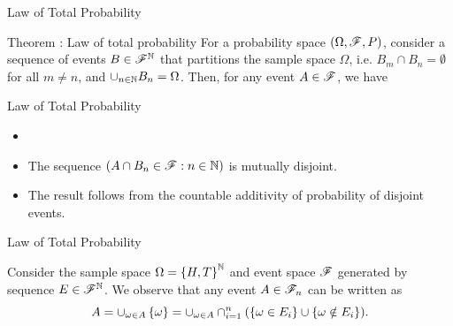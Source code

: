\documentclass[12pt,aspectratio=169]{beamer}
\begin{document}
\begin{frame}{Law of Total Probability}
\begin{block}{Theorem : Law of total probability} 
For a probability space $(\Omega, \mathscr{F}, P)$, 
consider a sequence of events $B\in \mathscr{F}^{\mathbb{N}}$ that partitions the sample space $\Omega$, i.e. 
$B_m \cap B_n = \emptyset$ for all $m \neq n$, and $\cup_{n \in \mathbb{N}}B_n = \Omega$. 
Then, for any event $A \in \mathscr{F}$, we have 
\end{block}
\end{frame}
\begin{frame}{Law of Total Probability}
\begin{Proof}
\begin{itemize}
    \item <1-> 
    \item <2-> The sequence $(A \cap B_n \in \mathscr{F}: n \in \mathbb{N})$ is mutually disjoint.
    \item <3-> The result follows from the countable additivity of probability of disjoint events.
\end{itemize}
\end{Proof}
\end{frame}
\begin{frame}{Law of Total Probability}
\begin{Example} 
Consider the sample space $\Omega = \left\{H,T\right\}^{\mathbb{N}}$ and event space $\mathscr{F}$ generated by sequence $E \in \mathscr{F}^{\mathbb{N}}$. 
We observe that any event $A \in \mathscr{F}_n$ can be written as 
\begin{equation*}
A = \cup_{\omega \in A}\left\{\omega\right\} 
= \cup_{\omega \in A}\cap_{i=1}^n(\left\{\omega \in E_i\right\}\cup\left\{\omega \notin E_i\right\}).
\end{equation*}  
\end{Example}
\end{frame}
\end{document}
